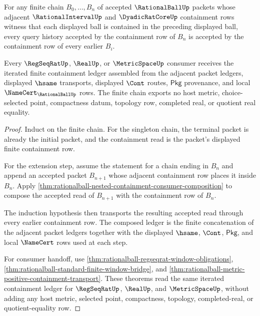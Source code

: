 \begin{theorem}
\label{thm:rationalball-nested-containment-refinement-monotonicity}
For any finite chain $B_0,\ldots,B_n$ of accepted $\RationalBallUp$ packets
whose adjacent $\RationalIntervalUp$ and $\DyadicRatCoreUp$ containment rows
witness that each displayed ball is contained in the preceding displayed ball,
every query history accepted by the containment row of $B_n$ is accepted by
the containment row of every earlier $B_i$.

Every $\RegSeqRatUp$, $\RealUp$, or $\MetricSpaceUp$ consumer receives the
iterated finite containment ledger assembled from the adjacent packet ledgers,
displayed $\hsame$ transports, displayed $\Cont$ routes, $\mathsf{Pkg}$
provenance, and local $\NameCert_{\RationalBallUp}$ rows. The finite chain
exports no host metric, choice-selected point, compactness datum, topology row,
completed real, or quotient real equality.
\end{theorem}
\begin{proof}
Induct on the finite chain. For the singleton chain, the terminal packet is
already the initial packet, and the containment read is the packet's displayed
finite containment row.

For the extension step, assume the statement for a chain ending in $B_n$ and
append an accepted packet $B_{n+1}$ whose adjacent containment row places it
inside $B_n$. Apply
\autoref{thm:rationalball-nested-containment-consumer-composition} to compose
the accepted read of $B_{n+1}$ with the containment row of $B_n$.

The induction hypothesis then transports the resulting accepted read through
every earlier containment row. The composed ledger is the finite concatenation
of the adjacent packet ledgers together with the displayed $\hsame$, $\Cont$,
$\mathsf{Pkg}$, and local $\NameCert$ rows used at each step.

For consumer handoff, use
\autoref{thm:rationalball-regseqrat-window-obligations},
\autoref{thm:rationalball-standard-finite-window-bridge}, and
\autoref{thm:rationalball-metric-positive-containment-transport}. These
theorems read the same iterated containment ledger for $\RegSeqRatUp$,
$\RealUp$, and $\MetricSpaceUp$, without adding any host metric, selected
point, compactness, topology, completed-real, or quotient-equality row.
\end{proof}


